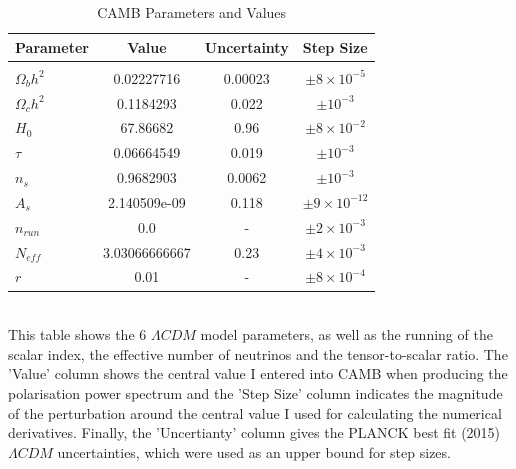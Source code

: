 \begin{table}[h]
\centering
\caption{CAMB Parameters and Values}
\label{my-label}
\begin{tabular}{l|l|l|l}
Parameter & \multicolumn{1}{c|}{Value} & Uncertainty & Step Size \\ \hline
& \multicolumn{1}{c|}{} & \multicolumn{1}{c|}{} & \multicolumn{1}{c}{} \\
$\Omega_{b}h^{2}$ & \multicolumn{1}{c|}{0.02227716} & \multicolumn{1}{c|}{0.00023} & \multicolumn{1}{c}{$\pm 8 \times 10^{-5}$} \\
$\Omega_{c}h^{2}$ & \multicolumn{1}{c|}{0.1184293} & \multicolumn{1}{c|}{0.022} & \multicolumn{1}{c}{$\pm 10^{-3}$} \\
$H_0$ & \multicolumn{1}{c|}{67.86682} & \multicolumn{1}{c|}{0.96} & \multicolumn{1}{c}{$\pm 8 \times 10^{-2}$} \\
$\tau$ & \multicolumn{1}{c|}{0.06664549} & \multicolumn{1}{c|}{0.019} & \multicolumn{1}{c}{$\pm 10^{-3}$} \\
$n_s$ & \multicolumn{1}{c|}{0.9682903} & \multicolumn{1}{c|}{0.0062} & \multicolumn{1}{c}{$\pm 10^{-3}$} \\
$A_s$ & \multicolumn{1}{c|}{2.140509e-09} & \multicolumn{1}{c|}{0.118} & \multicolumn{1}{c}{$\pm 9 \times 10^{-12}$} \\
$n_{run}$ & \multicolumn{1}{c|}{0.0} & \multicolumn{1}{c|}{-} & \multicolumn{1}{c}{$\pm 2 \times 10^{-3}$} \\
$N_{eff}$ & \multicolumn{1}{c|}{3.03066666667} & \multicolumn{1}{c|}{0.23} & \multicolumn{1}{c}{$\pm 4 \times 10^{-3}$} \\
$r$ & \multicolumn{1}{c|}{0.01} & \multicolumn{1}{c|}{-} & \multicolumn{1}{c}{$\pm 8 \times 10^{-4}$} \\
\end{tabular}
\bigskip
\\This table shows the 6 $\Lambda CDM$ model parameters, as well as the running of the scalar index, the effective number of neutrinos and the tensor-to-scalar ratio. The 'Value' column shows the central value I entered into CAMB when producing the polarisation power spectrum and the 'Step Size' column indicates the magnitude of the perturbation around the central value I used for calculating the numerical derivatives. Finally, the 'Uncertianty' column gives the PLANCK best fit (2015) \cite{Ade:2015xua} $\Lambda CDM$ uncertainties, which were used as an upper bound for step sizes.
\end{table}
\\

